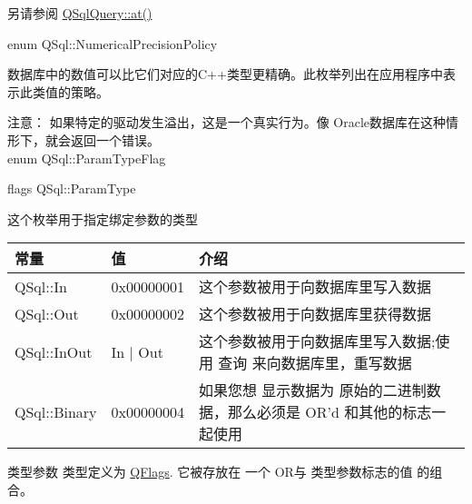 另请参阅 \href{https://doc.qt.io/qt-5/qsqlquery.html#at}{QSqlQuery::at()}

enum QSql::NumericalPrecisionPolicy


数据库中的数值可以比它们对应的C++类型更精确。此枚举列出在应用程序中表示此类值的策略。



注意： 如果特定的驱动发生溢出，这是一个真实行为。像 Oracle数据库在这种情形下，就会返回一个错误。\\


enum QSql::ParamTypeFlag


flags QSql::ParamType


这个枚举用于指定绑定参数的类型

\begin{tabular}{|l|l|l|}
	\hline
		常量	& 值 & 介绍 \\
	\hline
	QSql::In&0x00000001&这个参数被用于向数据库里写入数据\\
	\hline
	QSql::Out&0x00000002&这个参数被用于向数据库里获得数据\\
	\hline
	QSql::InOut&In | Out&这个参数被用于向数据库里写入数据;使用 查询 来向数据库里，重写数据\\
	\hline
	QSql::Binary&0x00000004&如果您想 显示数据为 原始的二进制数据，那么必须是 OR'd 和其他的标志一 起使用\\
	\hline
\end{tabular}

类型参数 类型定义为 \href{https://doc.qt.io/qt-5/qflags.html}{QFlags}. 它被存放在 一个 OR与 类型参数标志的值 的组合。





